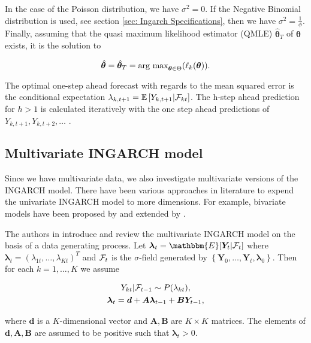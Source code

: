 In the case of the Poisson distribution, we have $\sigma^2=0$. If the Negative Binomial distribution is used, see section \ref{sec: Ingarch Specifications}, then we have $\sigma^2=\frac{1}{\phi}$. 
Finally, assuming that the quasi maximum likelihood estimator (QMLE) $\hat{\bm{\theta}}_T$ of $\bm{\theta}$ exists, it is the solution to 

\begin{equation}
\hat{\bm{\theta}}= \hat{\bm{\theta}}_T = \text{arg max}_{\bm{\theta} \in \Theta} (\ell_k(\bm{\theta})). 
\label{eq:ingarch qmle}
\end{equation}

The optimal one-step ahead forecast with regards to the mean squared error is the conditional expectation $\lambda_{k,t+1}=\mathbb{E}\left[Y_{k,t+1} | \mathcal{F}_{kt} \right]$. The h-step ahead prediction for $h>1$ is calculated iteratively with the one step ahead predictions of $Y_{k,t+1},Y_{k,t+2},\ldots$ \cite{Liboschik:2016}. 

\subsection{Multivariate INGARCH model}
\label{sec: Multivariate Ingarch}

Since we have multivariate data, we also investigate multivariate versions of the INGARCH model. There have been various approaches in literature to expend the univariate INGARCH model to more dimensions. For example, bivariate models have been proposed by \cite{Liu:2012} and  extended by \cite{Cui:2018}. 

The authors in \cite{Fokianos:2020,Fokianos:2021} introduce and review the multivariate INGARCH model on the basis of a data generating process. Let $\bm{\lambda}_t=\mathbbm{E}[\bm{Y}_t|\SigA_t]$ where $\bm{\lambda}_t = (\lambda_{1t},\ldots,\lambda_{Kt})^T$ and $\mathcal{F}_t$ is the $\sigma$-field generated by $\left\{\bm{Y}_0,\ldots,\bm{Y}_t,\bm{\lambda}_0\right\}$. Then for each $k=1,\ldots,K$ we assume

\begin{equation}
\begin{gathered}
Y_{kt} | \mathcal{F}_{t-1} \sim P(\lambda_{kt}), \\
\bm{\lambda}_t = \bm{d} + \bm{A}\bm{\lambda}_{t-1} + \bm{B}\bm{Y}_{t-1},
\label{eq:Mingarch 1}
\end{gathered}
\end{equation}

where $\bm{d}$ is a $K$-dimensional vector and $\bm{A},\bm{B}$ are $K\times K$ matrices. The elements of $\bm{d},\bm{A},\bm{B}$ are assumed to be positive such that $\bm{\lambda}_t > 0$. 

